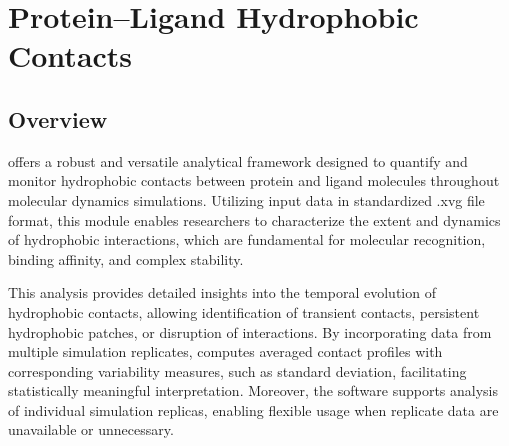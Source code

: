 \documentclass[a4paper,10pt,english]{sphinxmanual}
\begin{document}
\begin{sphinxVerbatim}[commandchars=\\\{\}]
   
      
      
     
\end{sphinxVerbatim}

\sphinxstepscope


\chapter{Protein–Ligand Hydrophobic Contacts}
\label{\detokenize{Hydrophobic_contacts:proteinligand-hydrophobic-contacts}}\label{\detokenize{Hydrophobic_contacts::doc}}

\section{Overview}
\label{\detokenize{Hydrophobic_contacts:overview}}
\sphinxAtStartPar
{} offers a robust and versatile analytical framework designed to quantify and monitor hydrophobic contacts between protein and ligand molecules throughout molecular dynamics simulations. Utilizing input data in standardized .xvg file format, this module enables researchers to characterize the extent and dynamics of hydrophobic interactions, which are fundamental for molecular recognition, binding affinity, and complex stability.

\sphinxAtStartPar
This analysis provides detailed insights into the temporal evolution of hydrophobic contacts, allowing identification of transient contacts, persistent hydrophobic patches, or disruption of interactions. By incorporating data from multiple simulation replicates,  computes averaged contact profiles with corresponding variability measures, such as standard deviation, facilitating statistically meaningful interpretation. Moreover, the software supports analysis of individual simulation replicas, enabling flexible usage when replicate data are unavailable or unnecessary.
\end{document}

